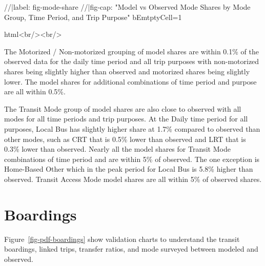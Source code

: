 \documentclass[
  letterpaper,
  DIV=11,
  numbers=noendperiod]{scrreprt}
\newenvironment{Shaded}{\begin{snugshade}}{\end{snugshade}}
\newcommand{\NormalTok}[1]{\textcolor[rgb]{0.00,0.23,0.31}{#1}}
\begin{document}
\begin{Shaded}
\begin{Highlighting}[]
\NormalTok{//|label: fig{-}mode{-}share}
\NormalTok{//|fig{-}cap: "Model vs Observed Mode Shares by Mode Group, Time Period, and Trip Purpose"}
\NormalTok{bEmtptyCell=1}
\end{Highlighting}
\end{Shaded}

\begin{Shaded}
\begin{Highlighting}[]
\NormalTok{html\textasciigrave{}\textless{}br/\textgreater{}\textless{}br/\textgreater{}\textasciigrave{}}
\end{Highlighting}
\end{Shaded}

The Motorized / Non-motorized grouping of model shares are within 0.1\%
of the observed data for the daily time period and all trip purposes
with non-motorized shares being slightly higher than observed and
motorized shares being slightly lower. The model shares for additional
combinations of time period and purpose are all within 0.5\%.

The Transit Mode group of model shares are also close to observed with
all modes for all time periods and trip purposes. At the Daily time
period for all purposes, Local Bus has slightly higher share at 1.7\%
compared to observed than other modes, such as CRT that is 0.5\% lower
than observed and LRT that is 0.3\% lower than observed. Nearly all the
model shares for Transit Mode combinations of time period and are within
5\% of observed. The one exception is Home-Based Other which in the peak
period for Local Bus is 5.8\% higher than observed. Transit Access Mode
model shares are all within 5\% of observed shares.

\hypertarget{boardings}{%
\section{Boardings}\label{boardings}}

Figure~\ref{fig-pdf-boardings} show validation charts to understand the
transit boardings, linked trips, transfer ratios, and mode surveyed
between modeled and observed.
\end{document}
